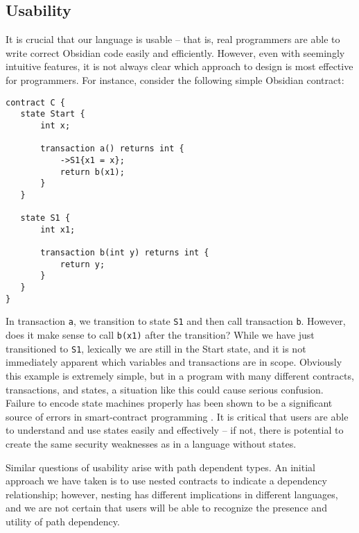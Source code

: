 \documentclass[sigplan,10pt,review]{acmart}\settopmatter{printfolios=true}
\begin{document}
\subsection{Usability}
It is crucial that our language is usable -- that is, real programmers are able to write correct Obsidian 
code easily and efficiently. However, even with seemingly intuitive features, it is not always clear 
which approach to design is most effective for programmers. For instance, consider the following simple 
Obsidian contract:

\begin{lstlisting}
contract C {
   state Start {
       int x;
  
       transaction a() returns int {
           ->S1{x1 = x};
           return b(x1);
       }
   }
  
   state S1 {
       int x1;
      
       transaction b(int y) returns int {
           return y;
       }
   }
}
\end{lstlisting}

In transaction \texttt{\small{a}}, we transition to state \texttt{\small{S1}} and then call transaction \texttt{\small{b}}. 
However, does it make sense to call \texttt{\small{b(x1)}} after the transition? While we have just 
transitioned to \texttt{\small{S1}}, lexically we are still in the 
Start state, and it is not immediately apparent which variables and transactions are in scope. 
Obviously this example is extremely simple, but in a program with many different contracts, 
transactions, and states, a situation like this could cause serious confusion. Failure to encode state 
machines properly has been shown to be a significant source of errors in smart-contract 
programming \cite{Delmolino}. It is critical that users are able to understand and use states easily and 
effectively -- if not, there is potential to create the same security weaknesses as in a 
language without states. 

	Similar questions of usability arise with path dependent types. An initial approach we have taken is 
to use nested contracts to indicate a dependency relationship; however, nesting has different 
implications in different languages, and we are not certain that users will be able to recognize the 
presence and utility of path dependency. 
\end{document}

